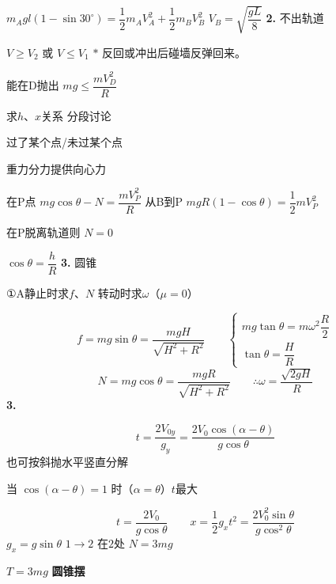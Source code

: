 $m_Agl(1-\sin30^\circ)=\dfrac12 m_AV_A^{2}+\dfrac12 m_BV_B^{2}$ \qquad $V_B=\sqrt{\dfrac{gL}{8}}$
\textbf{2.} 不出轨道

$V\ge V_2$ 或 $V\le V_1$ \qquad $\ast$ 反回或冲出后碰墙反弹回来。

能在D抛出 \quad $mg\le\dfrac{mV_D^{2}}{R}$

求$h$、$x$关系 分段讨论

过了某个点/未过某个点

重力分力提供向心力

在P点 $mg\cos\theta-N=\dfrac{mV_P^{2}}{R}$ \qquad 从B到P $mgR(1-\cos\theta)=\dfrac12 mV_P^{2}$

在P脱离轨道则 $N=0$

$\cos\theta=\dfrac{h}{R}$
\textbf{3.} 圆锥

①A静止时求$f$、$N$ \quad 转动时求$\omega$（$\mu=0$）

\[ f=mg\sin\theta=\frac{mgH}{\sqrt{H^{2}+R^{2}}}\qquad
\begin{cases} mg\tan\theta=m\omega^{2}\dfrac{R}{2}\\[4pt] \tan\theta=\dfrac{H}{R}\end{cases} \]
\[ N=mg\cos\theta=\frac{mgR}{\sqrt{H^{2}+R^{2}}}\qquad \therefore\omega=\frac{\sqrt{2gH}}{R} \]
\textbf{3.}

\[ t=\frac{2V_{0y}}{g_y}=\frac{2V_0\cos(\alpha-\theta)}{g\cos\theta} \]
也可按斜抛水平竖直分解

当 $\cos(\alpha-\theta)=1$ 时（$\alpha=\theta$）$t$最大

\[ t=\frac{2V_0}{g\cos\theta}\qquad x=\frac12 g_xt^{2}=\frac{2V_0^{2}\sin\theta}{g\cos^{2}\theta} \]
$g_x=g\sin\theta$
$1\to2$ 在$2$处 $N=3mg$\par
$T=3mg$
\textbf{圆锥摆}

